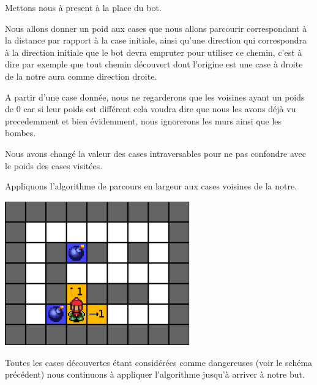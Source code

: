 			Mettons nous à present à la place du \gls{bot}.
			
			Nous allons donner un poid aux cases que nous allons parcourir
			correspondant à la distance par rapport à la case initiale, ainsi qu'une
			direction qui correspondra à la direction initiale que le \gls{bot} devra empruter
			pour utiliser ce chemin, c'est à dire par exemple que tout chemin découvert
			dont l'origine est une case à droite de la notre aura comme direction droite.
			
			A partir d'une case donnée, nous ne regarderons que les voisines ayant un poids de 0
			car si leur poids est différent cela voudra dire que nous les avons déjà vu precedemment et bien évidemment,
			nous ignorerons les murs ainsi que les bombes.
			
			Nous avons changé la valeur des cases intraversables pour ne pas confondre avec le poids des cases visitées.			
			
			Appliquons l'algorithme de parcours en largeur aux cases voisines de la notre.
			
			
			\begin{center}
				\includegraphics[width=8cm]{./Analyse/Img/largeur_2.eps}
			\end{center}
			
			
			Toutes les cases découvertes étant considérées comme dangereuses (voir le schéma précédent) nous continuons à appliquer l'\gls{algorithme} jusqu'à arriver à notre but.
			
